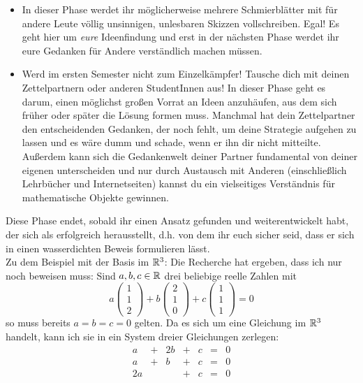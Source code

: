 \begin{de}
\begin{itemize}
        \item In dieser Phase werdet ihr möglicherweise mehrere Schmierblätter mit für andere Leute völlig unsinnigen, unlesbaren Skizzen vollschreiben. Egal! Es geht hier um \emph{eure} Ideenfindung und erst in der nächsten Phase werdet ihr eure Gedanken für Andere verständlich machen müssen.
        \item Werd im ersten Semester nicht zum Einzelkämpfer! Tausche dich mit deinen Zettelpartnern oder anderen StudentInnen aus! In dieser Phase geht es darum, einen möglichst großen Vorrat an Ideen anzuhäufen, aus dem sich früher oder später die Lösung formen muss. Manchmal hat dein Zettelpartner den entscheidenden Gedanken, der noch fehlt, um deine Strategie aufgehen zu lassen und es wäre dumm und schade, wenn er ihn dir nicht mitteilte. Außerdem kann sich die Gedankenwelt deiner Partner fundamental von deiner eigenen unterscheiden und nur durch Austausch mit Anderen (einschließlich Lehrbücher und Internetseiten) kannst du ein vielseitiges Verständnis für mathematische Objekte gewinnen.
    \end{itemize}
    Diese Phase endet, sobald ihr einen Ansatz gefunden und weiterentwickelt habt, der sich als erfolgreich herausstellt, d.h. von dem ihr euch sicher seid, dass er sich in einen wasserdichten Beweis formulieren lässt. \\[0.5em]
    Zu dem Beispiel mit der Basis im $\mathbb R^3$: Die Recherche hat ergeben, dass ich nur noch beweisen muss: Sind $a,b,c\in \mathbb R$ drei beliebige reelle Zahlen mit
        \[ a\begin{pmatrix} 1 \\ 1 \\ 2 \end{pmatrix} + b \begin{pmatrix} 2 \\ 1 \\ 0 \end{pmatrix}+c \begin{pmatrix} 1 \\ 1 \\ 1 \end{pmatrix} = 0  \]
    so muss bereits $a=b=c=0$ gelten. Da es sich um eine Gleichung im $\mathbb R^3$ handelt, kann ich sie in ein System dreier Gleichungen zerlegen:
    \[\begin{array}{ccccccc}
        a &+& 2b &+& c &=& 0 \\
        a &+& b &+& c & =& 0 \\
        2a && &+ &c & =& 0
    \end{array}\]

\end{de}
